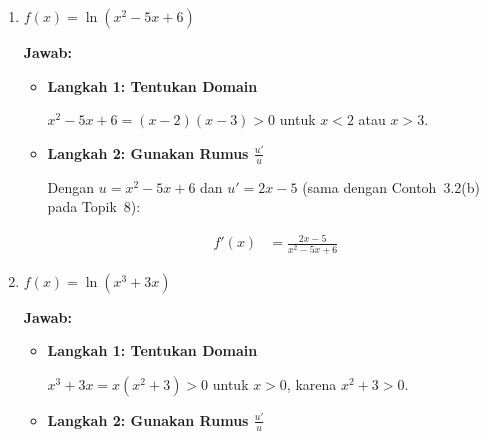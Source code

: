 \documentclass[10pt,a4paper]{article}
\newcounter{eqblock}
\newcommand{\reseteq}{%
  \stepcounter{eqblock}%
  \setcounter{equation}{0}%
  \renewcommand{\theHequation}{\arabic{eqblock}.\arabic{equation}}%
}
\begin{document}
\begin{enumerate}
\begin{enumerate}
\textbf{Jawab:}
\begin{itemize}
\item \textbf{Langkah 1: Tentukan $u$ dan $u'$}

Misalkan $u = \tan 2x$ (dengan $\tan 2x > 0$), maka $u' = 2\sec^2 2x$.

\item \textbf{Langkah 2: Gunakan Rumus $\frac{u'}{u}$ dan Sederhanakan}

Tulis $\sec$ dan $\tan$ dalam $\sin$ dan $\cos$:
\reseteq
\begin{align}
f'(x) &= \frac{2\sec^2 2x}{\tan 2x} = \frac{2}{\cos^2 2x} \cdot \frac{\cos 2x}{\sin 2x} = \frac{2}{\sin 2x\cos 2x} \\
&= \frac{4}{2\sin 2x\cos 2x} = \frac{4}{\sin 4x} \quad \text{(Sudut ganda: $2\sin\theta\cos\theta = \sin 2\theta$)} \\
&= 4\csc 4x
\end{align}
\end{itemize}

\item $f(x) = \ln(x^2 - 5x + 6)$

\textbf{Jawab:}
\begin{itemize}
\item \textbf{Langkah 1: Tentukan Domain}

$x^2 - 5x + 6 = (x - 2)(x - 3) > 0$ untuk $x < 2$ atau $x > 3$.

\item \textbf{Langkah 2: Gunakan Rumus $\frac{u'}{u}$}

Dengan $u = x^2 - 5x + 6$ dan $u' = 2x - 5$ (sama dengan Contoh~3.2(b) pada Topik~8):
\reseteq
\begin{align}
f'(x) &= \frac{2x - 5}{x^2 - 5x + 6}
\end{align}
\end{itemize}

\item $f(x) = \ln(x^3 + 3x)$

\textbf{Jawab:}
\begin{itemize}
\item \textbf{Langkah 1: Tentukan Domain}

$x^3 + 3x = x(x^2 + 3) > 0$ untuk $x > 0$, karena $x^2 + 3 > 0$.

\item \textbf{Langkah 2: Gunakan Rumus $\frac{u'}{u}$}


\end{itemize}
\end{enumerate}
\end{enumerate}
\end{document}
